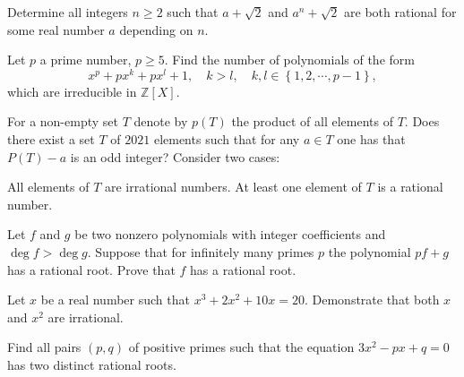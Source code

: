 \begin{question}[name={2017 Romania TST}]
    Determine all integers $n\geq 2$ such that $a+\sqrt{2}$ and $a^n+\sqrt{2}$ are both rational for some real number $a$ depending on $n$.
\end{question}

\begin{question}[name={2006 Romania TST}]
    Let $p$ a prime number, $p\geq 5$. Find the number of polynomials of the form
    \[ x^p + px^k + p x^l + 1, \quad k > l, \quad k, l \in \left\{1,2,\cdots,p-1\right\},\] which are irreducible in $\mathbb{Z}[X]$.
\end{question}


\begin{question}[name={2021 Saudi Arabia TST}]
    For a non-empty set $T$ denote by $p(T)$ the product of all elements of $T$. Does there exist a set $T$ of $2021$ elements such that for any $a\in T$ one has that $P(T)-a$ is an odd integer? Consider two cases:
    \begin{tasks}
        \task All elements of $T$ are irrational numbers.
        \task At least one element of $T$ is a rational number.
    \end{tasks}
\end{question}

\begin{question}[name={2012 IMO Shortlist}]
    Let $f$ and $g$ be two nonzero polynomials with integer coefficients and $\deg f>\deg g$. Suppose that for infinitely many primes $p$ the polynomial $pf+g$ has a rational root. Prove that $f$ has a rational root.
\end{question}

\begin{question}[name={2003 Spain}]
    Let ${x}$ be a real number such that ${x^3 + 2x^2 + 10x = 20.}$ Demonstrate that both ${x}$ and ${x^2}$ are irrational.
\end{question}

\begin{question}[name={1993 Italy}]
    Find all pairs $(p,q)$ of positive primes such that the equation $3x^2 - px + q = 0$ has two distinct rational roots.
\end{question}

